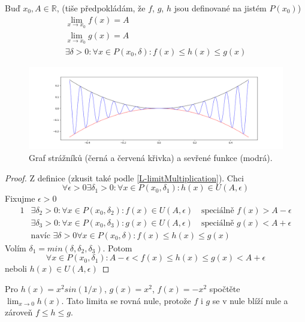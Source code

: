 \begin{theorem}[O strážnících]
    Buď $x_0, A\in\mathbb{R}$, (tiše předpokládám, že $f$, $g$, $h$ jsou definované na jistém $P(x_0)$)
    \begin{gather}
        \lim_{x\to x_0}f(x)=A \\
        \lim_{x\to x_0}g(x)=A \\
        \exists\delta>0:\forall x\in P(x_0,\delta):f(x)\leq h(x)\leq g(x)
    \end{gather}
    \begin{figure}[ht!]
        \begin{center}
            \includegraphics[width=\textwidth,keepaspectratio]{../img/chapter2/patrolmen.png}
            \caption{Graf strážníků (černá a červená křivka) a sevřené funkce (modrá).}
        \end{center}
    \end{figure}\FloatBarrier
\end{theorem}
\begin{proof}
    Z definice (zkusit také podle \autoref{L-limitMultiplication}). Chci
    \begin{equation}
        \forall\epsilon>0\exists\delta_1>0:\forall x\in P(x_0,\delta_1):h(x)\in U(A,\epsilon)
    \end{equation}
    Fixujme $\epsilon>0$
    \begin{alignat}{1}
        &\exists\delta_2>0:\forall x\in P(x_0,\delta_2):f(x)\in U(A,\epsilon)
            \quad\text{speciálně }f(x)>A-\epsilon \\
        &\exists\delta_3>0:\forall x\in P(x_0,\delta_3):g(x)\in U(A,\epsilon)
            \quad\text{speciálně }g(x)<A+\epsilon \\
        &\text{navíc }\exists\delta>0\forall x\in P(x_0,\delta):f(x)\leq h(x)\leq g(x)
    \end{alignat}
    Volím $\delta_1=min(\delta,\delta_2,\delta_3)$. Potom
    \begin{equation}
        \forall x\in P(x_0,\delta_1):A-\epsilon<f(x)\leq h(x)\leq g(x)<A+\epsilon
    \end{equation}
    neboli $h(x)\in U(A,\epsilon)$
\end{proof}
\begin{example}
    Pro $h(x)=x^2sin(1/x)$, $g(x)=x^2$, $f(x)=-x^2$ spočtěte \\ $\lim_{x\to 0}h(x)$.
    Tato limita se rovná nule, protože $f$ i $g$ se v nule blíží nule a zároveň $f\leq h\leq g$.
\end{example}

